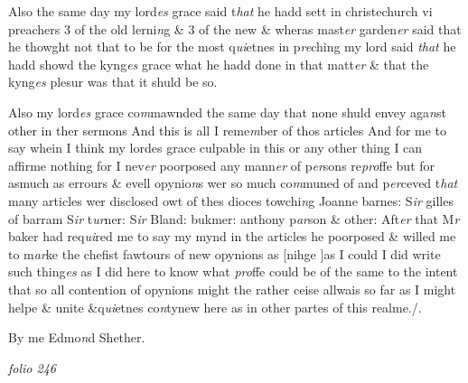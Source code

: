 \documentclass[12pt, a4paper]{book}
\begin{document}
		\ifthenelse{\isodd{\thepage}}
		{\reversemarginpar}
		{\normalmarginpar}
		Also the same day my lord\textit{es} grace said t\textit{hat} he hadd sett in christechurch
            			vi preachers 3 of the old lerni\textit{n}g \& 3 of the new \& wheras mast\textit{er}
garden\textit{er} said that he thowght not that to be for the most q\textit{ui}etnes in 
p\textit{re}ching my lord said \textit{that} he hadd showd the kyng\textit{es} grace what he hadd 
done in that matt\textit{er} \& that the kyng\textit{es} plesur was that it shuld be 
so.
            		
				\marginpar[\vspace{0.5cm}{\textcolor{Gray}{n}}]{}
			
            			
				\marginpar[\vspace{0.5cm}{\textcolor{Gray}{M. Baker}}]{}
			
            			
		\ifthenelse{\isodd{\thepage}}
		{\reversemarginpar}
		{\normalmarginpar}
		Also my lord\textit{es} grace co\textit{m}mawnded the same day that none
			 shuld envey aga\textit{n}st
other in ther sermons And this is all I reme\textit{m}ber of thos articles
            			And for me to say whein I think my lordes grace culpable in this 
or any other thing I can affirme nothing for I nev\textit{er} poorposed
any mann\textit{er} of p\textit{er}sons re\textit{pro}ffe but for asmuch as errours \& evell opynio\textit{n}s
wer so much co\textit{m}muned of and p\textit{er}ceved t\textit{hat} many articles wer
disclosed owt of thes dioces towchi\textit{n}g Joanne barnes: S\textit{ir} gilles of barram
            			S\textit{ir} t\textit{ur}ner: S\textit{ir} Bland: bukmer: anthony p\textit{ar}son \& other: Aft\textit{er} that M\textit{r} baker had 
req\textit{ui}red me to say my mynd in the articles he poorposed \& willed me 
to m\textit{ar}ke the chefist fawtours of new opynions as [nihge ]as I could
I did write such thing\textit{es} as I did here to know what \textit{pro}ffe could be of 
the same to the intent that so all contention of opynions might
the rather ceise allwais so far as I might helpe \& unite \&q\textit{ui}etnes
co\textit{n}tynew here as in other partes of this realme./. 

		\ifthenelse{\isodd{\thepage}}
		{\reversemarginpar}
		{\normalmarginpar}
		By me Edmo\textit{n}d Shether.

\dotfill
						\newpage
{}

\textit{folio 246}
\end{document}
